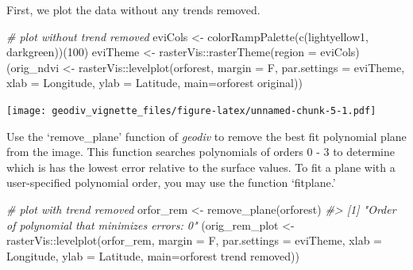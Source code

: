 \documentclass[
]{article}
\newenvironment{Shaded}{\begin{snugshade}}{\end{snugshade}}
\newcommand{\AttributeTok}[1]{\textcolor[rgb]{0.77,0.63,0.00}{#1}}
\newcommand{\CommentTok}[1]{\textcolor[rgb]{0.56,0.35,0.01}{\textit{#1}}}
\newcommand{\DecValTok}[1]{\textcolor[rgb]{0.00,0.00,0.81}{#1}}
\newcommand{\FunctionTok}[1]{\textcolor[rgb]{0.00,0.00,0.00}{#1}}
\newcommand{\NormalTok}[1]{#1}
\newcommand{\OtherTok}[1]{\textcolor[rgb]{0.56,0.35,0.01}{#1}}
\newcommand{\SpecialCharTok}[1]{\textcolor[rgb]{0.00,0.00,0.00}{#1}}
\newcommand{\StringTok}[1]{\textcolor[rgb]{0.31,0.60,0.02}{#1}}
\begin{document}
First, we plot the data without any trends removed.

\begin{Shaded}
\begin{Highlighting}[]
\CommentTok{\# plot without trend removed}
\NormalTok{eviCols }\OtherTok{\textless{}{-}} \FunctionTok{colorRampPalette}\NormalTok{(}\FunctionTok{c}\NormalTok{(}\StringTok{\textquotesingle{}lightyellow1\textquotesingle{}}\NormalTok{, }\StringTok{\textquotesingle{}darkgreen\textquotesingle{}}\NormalTok{))(}\DecValTok{100}\NormalTok{)}
\NormalTok{eviTheme }\OtherTok{\textless{}{-}}\NormalTok{ rasterVis}\SpecialCharTok{::}\FunctionTok{rasterTheme}\NormalTok{(}\AttributeTok{region =}\NormalTok{ eviCols)}
\NormalTok{(orig\_ndvi }\OtherTok{\textless{}{-}}\NormalTok{ rasterVis}\SpecialCharTok{::}\FunctionTok{levelplot}\NormalTok{(orforest, }\AttributeTok{margin =}\NormalTok{ F, }
                                  \AttributeTok{par.settings =}\NormalTok{ eviTheme, }\AttributeTok{xlab =} \StringTok{\textquotesingle{}Longitude\textquotesingle{}}\NormalTok{, }
                                  \AttributeTok{ylab =} \StringTok{\textquotesingle{}Latitude\textquotesingle{}}\NormalTok{, }\AttributeTok{main=}\StringTok{\textquotesingle{}orforest original\textquotesingle{}}\NormalTok{))}
\end{Highlighting}
\end{Shaded}

\texttt{[image: geodiv\_vignette\_files/figure-latex/unnamed-chunk-5-1.pdf]}

Use the `remove\_plane' function of \emph{geodiv} to remove the best fit
polynomial plane from the image. This function searches polynomials of
orders 0 - 3 to determine which is has the lowest error relative to the
surface values. To fit a plane with a user-specified polynomial order,
you may use the function `fitplane.'

\begin{Shaded}
\begin{Highlighting}[]
\CommentTok{\# plot with trend removed }
\NormalTok{orfor\_rem }\OtherTok{\textless{}{-}} \FunctionTok{remove\_plane}\NormalTok{(orforest)}
\CommentTok{\#\textgreater{} [1] "Order of polynomial that minimizes errors: 0"}
\NormalTok{(orig\_rem\_plot }\OtherTok{\textless{}{-}}\NormalTok{ rasterVis}\SpecialCharTok{::}\FunctionTok{levelplot}\NormalTok{(orfor\_rem, }\AttributeTok{margin =}\NormalTok{ F, }
                                      \AttributeTok{par.settings =}\NormalTok{ eviTheme, }
                                      \AttributeTok{xlab =} \StringTok{\textquotesingle{}Longitude\textquotesingle{}}\NormalTok{, }\AttributeTok{ylab =} \StringTok{\textquotesingle{}Latitude\textquotesingle{}}\NormalTok{, }
                                      \AttributeTok{main=}\StringTok{\textquotesingle{}orforest trend removed\textquotesingle{}}\NormalTok{))}
\end{Highlighting}
\end{Shaded}
\end{document}
